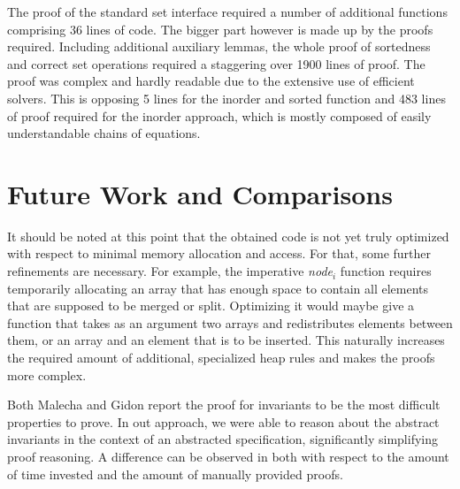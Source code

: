 The proof of the standard set interface required a number of additional functions
comprising 36 lines of code.
The bigger part however is made up by the proofs required.
Including additional auxiliary lemmas, the whole proof of sortedness
and correct set operations required a staggering over 1900 lines of proof.
The proof was complex and hardly readable due to the 
extensive use of efficient solvers.
This is opposing 5 lines for the inorder and sorted function and
483 lines of proof required for the inorder approach,
which is mostly composed of easily understandable chains of equations.


\section{Future Work and Comparisons}

It should be noted at this point that the obtained code is not yet
truly optimized with respect to minimal memory allocation and access.
For that, some further refinements are necessary.
For example, the imperative \textit{node$_i$} function
requires temporarily allocating
an array that has enough space to contain
all elements that are supposed to be merged or split.
Optimizing it would maybe give a function that takes
as an argument two arrays and redistributes elements between them,
or an array and an element that is to be inserted.
This naturally increases the required amount of additional,
specialized heap rules and makes the proofs more complex.


Both Malecha and Gidon report the proof for invariants
to be the most difficult properties to prove.
In out approach, we were able to reason about the abstract invariants
in the context of an abstracted specification,
significantly simplifying proof reasoning.
A difference can be observed in \label{fig:proof-comparison}
both with respect to the amount of 
time invested and the amount of manually provided proofs.


